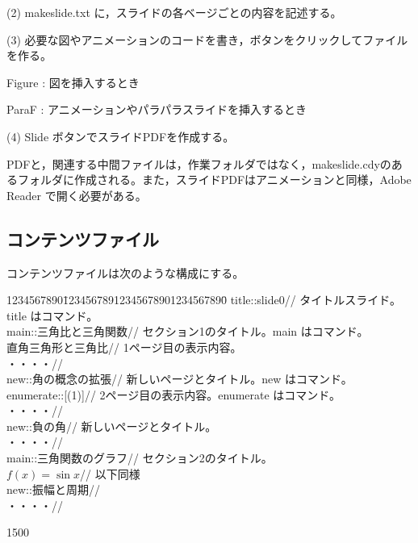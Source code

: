 \documentclass[papersize,a4paper,12pt,uplatex]{jsarticle}
\begin{document}
(2) makeslide.txt に，スライドの各ベージごとの内容を記述する。

(3) 必要な図やアニメーションのコードを書き，ボタンをクリックしてファイルを作る。

\hspace{10mm}Figure : 図を挿入するとき

\hspace{10mm}ParaF : アニメーションやパラパラスライドを挿入するとき

(4) Slide ボタンでスライドPDFを作成する。

PDFと，関連する中間ファイルは，作業フォルダではなく，makeslide.cdyのあるフォルダに作成される。また，スライドPDFはアニメーションと同様，Adobe Reader で開く必要がある。

\subsection{コンテンツファイル}

コンテンツファイルは次のような構成にする。

\begin{tabbing}
1234567890\=12345678912345678901234567890\=\kill
 \>title::slide0//  \> タイトルスライド。title はコマンド。\\
 \>main::三角比と三角関数//  \> セクション1のタイトル。main はコマンド。\\
 \>  直角三角形と三角比//  \> 1ページ目の表示内容。\\
 \>  ・・・・// \\
 \> new::角の概念の拡張//  \> 新しいページとタイトル。new はコマンド。\\
 \> enumerate::[(1)]// \> 2ページ目の表示内容。enumerate はコマンド。\\
 \> ・・・・//  \\
 \> new::負の角//  \> 新しいページとタイトル。\\
 \> ・・・・//  \\
 \>main::三角関数のグラフ//  \> セクション2のタイトル。\\
 \>  $f(x)=\sin x$//  \> \hspace{10mm}以下同様\\
 \> new::振幅と周期// \\
 \> ・・・・//  \\ 
\end{tabbing}
\begin{layer}{150}{0}
\hspace{7mm}
\end{layer}
\end{document}

